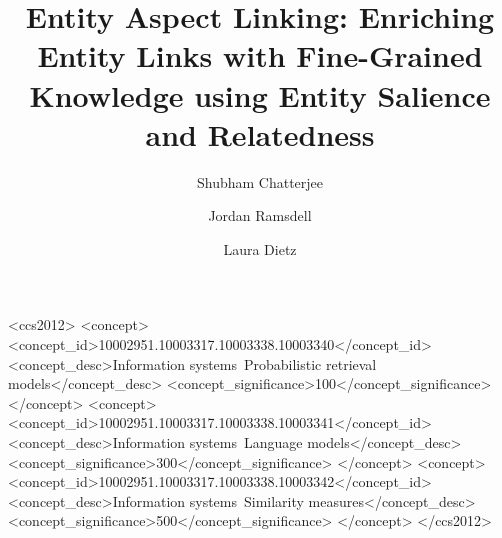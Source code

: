 \documentclass[sigconf,anonymous,review,screen]{acmart}
\begin{document}
%
\title[Entity Aspect Linking]{Entity Aspect Linking: Enriching Entity Links with Fine-Grained Knowledge using Entity Salience and Relatedness}

%
\author{Shubham Chatterjee}
\author{Jordan Ramsdell}
\author{Laura Dietz}

%
\renewcommand{\shortauthors}{Chatterjee et al.}

%


\begin{CCSXML}
<ccs2012>
   <concept>
       <concept_id>10002951.10003317.10003338.10003340</concept_id>
       <concept_desc>Information systems~Probabilistic retrieval models</concept_desc>
       <concept_significance>100</concept_significance>
       </concept>
   <concept>
       <concept_id>10002951.10003317.10003338.10003341</concept_id>
       <concept_desc>Information systems~Language models</concept_desc>
       <concept_significance>300</concept_significance>
       </concept>
   <concept>
       <concept_id>10002951.10003317.10003338.10003342</concept_id>
       <concept_desc>Information systems~Similarity measures</concept_desc>
       <concept_significance>500</concept_significance>
       </concept>
 </ccs2012>
\end{CCSXML}

\end{document}
